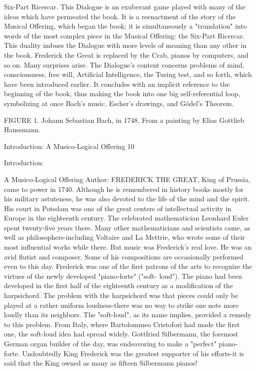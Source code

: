 Six-Part Ricercar. This Dialogue is an exuberant game played with many of the ideas which have
   permeated the book. It is a reenactment of the story of the Musical Offering, which began the
   book; it is simultaneously a "translation" into words of the most complex piece in the Musical
   Offering: the Six-Part Ricercar. This duality imbues the Dialogue with more levels of meaning
   than any other in the book. Frederick the Great is replaced by the Crab, pianos by computers, and
   so on. Many surprises arise. The Dialogue's content concerns problems of mind, consciousness,
   free will, Artificial Intelligence, the Turing test, and so forth, which have been introduced earlier.
   It concludes with an implicit reference to the beginning of the book, thus making the book into
   one big self-referential loop, symbolizing at once Bach's music, Escher's drawings, and Gödel’s
   Theorem.





FIGURE 1. Johann Sebastian Bach, in 1748. From a painting by Elias Gottlieb
Hanssmann.




Introduction: A Musico-Logical Offering                                 10

                                    Introduction:

                            A Musico-Logical Offering
Author:
   FREDERICK THE GREAT, King of Prussia, came to power in 1740. Although he is
remembered in history books mostly for his military astuteness, he was also devoted to
the life of the mind and the spirit. His court in Potsdam was one of the great centers of
intellectual activity in Europe in the eighteenth century. The celebrated mathematician
Leonhard Euler spent twenty-five years there. Many other mathematicians and scientists
came, as well as philosophers-including Voltaire and La Mettrie, who wrote some of their
most influential works while there.
   But music was Frederick's real love. He was an avid flutist and composer. Some of his
compositions are occasionally performed even to this day. Frederick was one of the first
patrons of the arts to recognize the virtues of the newly developed "piano-forte" ("soft-
loud"). The piano had been developed in the first half of the eighteenth century as a
modification of the harpsichord. The problem with the harpsichord was that pieces could
only be played at a rather uniform loudness-there was no way to strike one note more
loudly than its neighbors. The "soft-loud", as its name implies, provided a remedy to this
problem. From Italy, where Bartolommeo Cristofori had made the first one, the soft-loud
idea had spread widely. Gottfried Silbermann, the foremost German organ builder of the
day, was endeavoring to make a "perfect" piano-forte. Undoubtedly King Frederick was
the greatest supporter of his efforts-it is said that the King owned as many as fifteen
Silbermann pianos!


